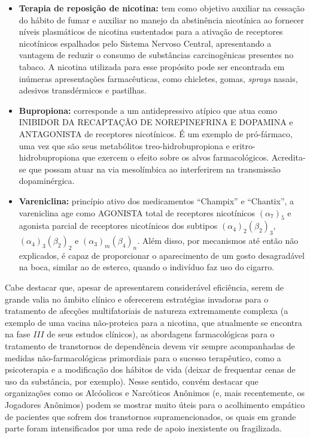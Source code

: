 \documentclass[
]{book}
\begin{document}
\begin{itemize}
\item
  \textbf{Terapia de reposição de nicotina:} tem como objetivo auxiliar na cessação do hábito de fumar e auxiliar no manejo da abstinência nicotínica ao fornecer níveis plasmáticos de nicotina sustentados para a ativação de receptores nicotínicos espalhados pelo Sistema Nervoso Central, apresentando a vantagem de reduzir o consumo de substâncias carcinogênicas presentes no tabaco. A nicotina utilizada para esse propósito pode ser encontrada em inúmeras apresentações farmacêuticas, como chicletes, gomas, \emph{sprays} nasais, adesivos transdérmicos e pastilhas.
\item
  \textbf{Bupropiona:} corresponde a um antidepressivo atípico que atua como INIBIDOR DA RECAPTAÇÃO DE NOREPINEFRINA E DOPAMINA e ANTAGONISTA de receptores nicotínicos. É um exemplo de pró-fármaco, uma vez que são seus metabólitos treo-hidrobupropiona e eritro-hidrobupropiona que exercem o efeito sobre os alvos farmacológicos. Acredita-se que possam atuar na via mesolímbica ao interferirem na transmissão dopaminérgica.
\item
  \textbf{Vareniclina:} princípio ativo dos medicamentos ``Champix'' e ``Chantix'', a vareniclina age como AGONISTA total de receptores nicotínicos \((\alpha_7)_5\) e agonista parcial de receptores nicotínicos dos subtipos \((\alpha_4)_2(\beta_2)_3\), \((\alpha_4)_3(\beta_2)_2\) e \((\alpha_3)_m(\beta_4)_n\). Além disso, por mecanismos até então não explicados, é capaz de proporcionar o aparecimento de um gosto desagradável na boca, similar ao de esterco, quando o indivíduo faz uso do cigarro.
\end{itemize}

Cabe destacar que, apesar de apresentarem considerável eficiência, serem de grande valia no âmbito clínico e oferecerem estratégias invadoras para o tratamento de afecções multifatoriais de natureza extremamente complexa (a exemplo de uma vacina não-proteica para a nicotina, que atualmente se encontra na fase \(III\) de seus estudos clínicos), as abordagens farmacológicas para o tratamento de transtornos de dependência devem vir sempre acompanhadas de medidas não-farmacológicas primordiais para o sucesso terapêutico, como a psicoterapia e a modificação dos hábitos de vida (deixar de frequentar cenas de uso da substância, por exemplo). Nesse sentido, convém destacar que organizações como os Alcóolicos e Narcóticos Anônimos (e, mais recentemente, os Jogadores Anônimos) podem se mostrar muito úteis para o acolhimento empático de pacientes que sofrem dos transtornos supramencionados, os quais em grande parte foram intensificados por uma rede de apoio inexistente ou fragilizada.
\end{document}
